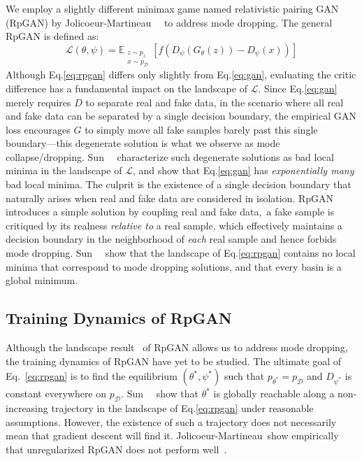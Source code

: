We employ a slightly different minimax game named relativistic pairing GAN (RpGAN) by Jolicoeur-Martineau~\etal~\cite{rgan} to address mode dropping. The general RpGAN is defined as:
\begin{equation}
\label{eq:rpgan}
\mathcal{L}(\theta,\psi)=\mathbb{E}_{\substack{z\sim p_z\\x\sim p_\mathcal{D}}}\left[f\left(  D_\psi(G_\theta(z))-D_\psi(x) \right)\right]
\end{equation}
Although Eq.\ref{eq:rpgan} differs only slightly from Eq.\ref{eq:gan}, evaluating the critic difference has a fundamental impact on the landscape of $\mathcal{L}$. Since Eq.\ref{eq:gan} merely requires $D$ to separate real and fake data, in the scenario where all real and fake data can be separated by a single decision boundary, the empirical GAN loss encourages $G$ to simply move all fake samples barely past this single boundary---this degenerate solution is what we observe as mode collapse/dropping. Sun~\etal~\cite{rpgan} characterize such degenerate solutions as bad local minima in the landscape of $\mathcal{L}$, and show that Eq.\ref{eq:gan} has \emph{exponentially many} bad local minima. The culprit is the existence of a single decision boundary that naturally arises when real and fake data are considered in isolation. RpGAN introduces a simple solution by coupling real and fake data,~\ie a fake sample is critiqued by its realness \emph{relative to} a real sample, which effectively maintains a decision boundary in the neighborhood of \emph{each} real sample and hence forbids mode dropping. Sun~\etal~\cite{rpgan} show that the landscape of Eq.\ref{eq:rpgan} contains no local minima that correspond to mode dropping solutions, and that every basin is a global minimum.

\vspace{-1ex}
\subsection{Training Dynamics of RpGAN}
\vspace{-1ex}
Although the landscape result~\cite{rpgan} of RpGAN allows us to address mode dropping, the training dynamics of RpGAN have yet to be studied. The ultimate goal of Eq.~\ref{eq:rpgan} is to find the equilibrium $(\theta^*,\psi^*)$ such that $p_{\theta^*}=p_\mathcal{D}$ and $D_{\psi^*}$ is constant everywhere on $p_\mathcal{D}$. Sun~\etal~\cite{rpgan} show that $\theta^*$ is globally reachable along a non-increasing trajectory in the landscape of Eq.\ref{eq:rpgan} under reasonable assumptions. However, the existence of such a trajectory does not necessarily mean that gradient descent will find it. Jolicoeur-Martineau~\etal show empirically that unregularized RpGAN does not perform well~\cite{rgan}. 

